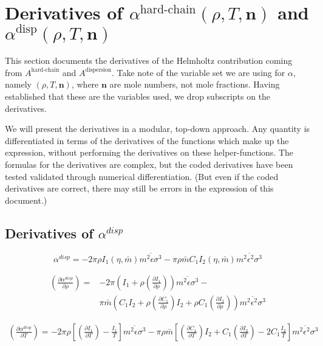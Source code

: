 \documentclass[internal,english]{sintefmemo2012}
\newcommand{\mbf}[0]{\mathbf}
\newcommand*{\pder}[2]{\left(\frac{\partial #1}{\partial #2}\right)}
\newcommand{\lp}{\left(}
\newcommand{\rp}{\right)}
\begin{document}
\section{Derivatives of $\alpha^{\text{hard-chain}} (\rho,T,\mbf n)$ and $\alpha^{\text{disp}} (\rho,T,\mbf n)$}
This section documents the derivatives of the Helmholtz contribution coming from
$A^{\text{hard-chain}}$ and $A^{\text{dispersion}}$. Take note of the variable
set we are using for $\alpha$, namely $(\rho,T,\mbf n)$, where $\mbf n$ are mole
numbers, not mole fractions. Having established that these are the variables
used, we drop subscripts on the
derivatives. %

We will present the derivatives in a modular, top-down approach. Any quantity is
differentiated in terms of the derivatives of the functions which make up the
expression, without performing the derivatives on these helper-functions. The
formulas for the derivatives are complex, but the coded derivatives have been
tested validated through numerical differentiation. (But even if the coded
derivatives are correct, there may still be errors in the expression of this
document.)
\subsection{Derivatives of $\alpha^{disp}$}
\begin{equation}
  \alpha^{disp} = -2 \pi \rho I_1(\eta,\bar m) \overline{m^2 \epsilon \sigma^3} - \pi \rho \bar m C_1 I_2(\eta,\bar m) \overline{m^2 \epsilon^2 \sigma^3}
\end{equation}

\begin{equation}
  \begin{aligned}
    \pder{\alpha^{disp}}{\rho} =& -2 \pi \lp I_1 + \rho \pder{I_1}{\rho} \rp \overline{m^2 \epsilon \sigma^3} - \\
    & \pi \bar m \lp C_1 I_2 + \rho \pder{C_1}{\rho} I_2 + \rho C_1 \pder{I_2}{\rho} \rp \overline{m^2 \epsilon^2 \sigma^3}
  \end{aligned}
\end{equation}

\begin{equation}
  \begin{aligned} %
    \pder{\alpha^{disp}}{T} = -2 \pi \rho \left[ \pder{I_1}{T} - \frac{I_1}{T} \right] \overline{m^2 \epsilon \sigma^3} - 
    \pi \rho \bar m \left[ \pder{C_1}{T} I_2 + C_1 \pder{I_2}{T} - 2 C_1 \frac{I_2}{T}\right] \overline{m^2 \epsilon^2 \sigma^3}
  \end{aligned}
\end{equation}
\end{document}
